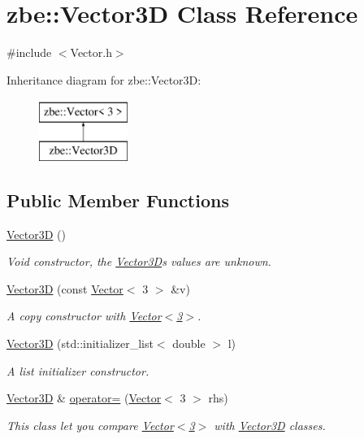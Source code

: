 \hypertarget{classzbe_1_1_vector3_d}{}\section{zbe\+:\+:Vector3\+D Class Reference}
\label{classzbe_1_1_vector3_d}


{\ttfamily \#include $<$Vector.\+h$>$}

Inheritance diagram for zbe\+:\+:Vector3\+D\+:\begin{figure}[H]
\begin{center}
\leavevmode
\includegraphics[height=2.000000cm]{classzbe_1_1_vector3_d}
\end{center}
\end{figure}
\subsection*{Public Member Functions}
\begin{DoxyCompactItemize}
\item 
\hyperlink{classzbe_1_1_vector3_d_a0d146ef6fbef42b6deb4515c249be745}{Vector3\+D} ()
\begin{DoxyCompactList}\small\item\em Void constructor, the \hyperlink{classzbe_1_1_vector3_d}{Vector3\+D}\textquotesingle{}s values are unknown. \end{DoxyCompactList}\item 
\hyperlink{classzbe_1_1_vector3_d_a44afbc2c1d8931955c60a0097a2d79eb}{Vector3\+D} (const \hyperlink{classzbe_1_1_vector}{Vector}$<$ 3 $>$ \&v)
\begin{DoxyCompactList}\small\item\em A copy constructor with \hyperlink{classzbe_1_1_vector}{Vector$<$3$>$}. \end{DoxyCompactList}\item 
\hyperlink{classzbe_1_1_vector3_d_a7d6e976edcc246ec0fc324702baa4de8}{Vector3\+D} (std\+::initializer\+\_\+list$<$ double $>$ l)
\begin{DoxyCompactList}\small\item\em A list initializer constructor. \end{DoxyCompactList}\item 
\hyperlink{classzbe_1_1_vector3_d}{Vector3\+D} \& \hyperlink{classzbe_1_1_vector3_d_a566d6b397c6e92ad804b56de7023b668}{operator=} (\hyperlink{classzbe_1_1_vector}{Vector}$<$ 3 $>$ rhs)
\begin{DoxyCompactList}\small\item\em This class let you compare \hyperlink{classzbe_1_1_vector}{Vector$<$3$>$} with \hyperlink{classzbe_1_1_vector3_d}{Vector3\+D} classes. \end{DoxyCompactList}\end{DoxyCompactItemize}
